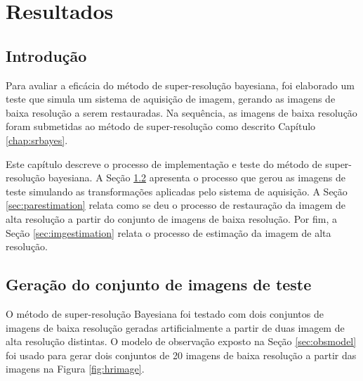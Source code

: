 \chapter{Resultados}
\label{chap:resultados}
\section{Introdução}
Para avaliar a eficácia do método de super-resolução bayesiana, 
foi elaborado um teste que simula um sistema de aquisição de imagem,
gerando as imagens de baixa resolução a serem restauradas.
Na sequência, as imagens de baixa resolução foram submetidas ao método de super-resolução como descrito Capítulo \ref{chap:srbayes}.

Este capítulo descreve o processo de implementação e teste do método de super-resolução bayesiana.
A Seção \ref{sec:gerimagens} apresenta o processo que gerou as imagens de teste simulando as transformações aplicadas pelo sistema de aquisição.
A Seção \ref{sec:parestimation} relata como se deu o processo de restauração da imagem de alta resolução a partir do conjunto de imagens de baixa resolução.
Por fim, a Seção \ref{sec:imgestimation} relata o processo de estimação da imagem de alta resolução.


\section{Geração do conjunto de imagens de teste}
\label{sec:gerimagens}

O método de super-resolução Bayesiana foi testado com dois conjuntos de imagens de
baixa resolução geradas artificialmente a partir de duas imagem de alta resolução
distintas.
O modelo de observação exposto na Seção \ref{sec:obsmodel} foi usado para gerar dois conjuntos de 20 imagens de baixa resolução a partir das imagens na Figura \ref{fig:hrimage}.


